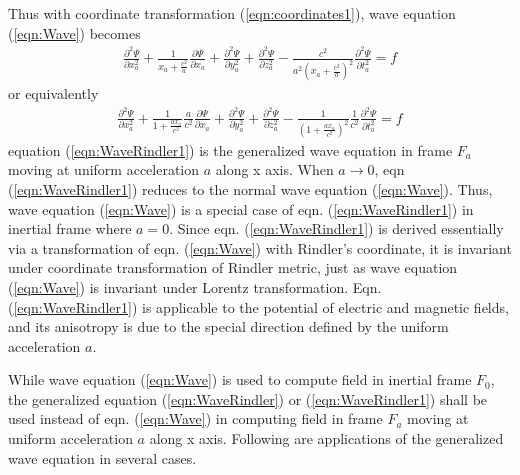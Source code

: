 \documentclass[prd,showpacs,preprint]{revtex4-1}
\begin{document}
Thus with coordinate transformation (\ref{eqn:coordinates1}), wave equation (\ref{eqn:Wave}) becomes
\begin{eqnarray}
\frac{\partial^2 \Psi}{\partial x_a^2} + \frac{1}{x_a+\frac{c^2}{a}}\frac{\partial \Psi}{\partial x_a} + \frac{\partial^2 \Psi}{\partial y_a^2} + \frac{\partial^2 \Psi}{\partial z_a^2} - \frac{c^2}{a^2(x_a+\frac{c^2}{a})^2}\frac{\partial^2 \Psi}{\partial t_a^2}=f
\label{eqn:WaveRindler}
\end{eqnarray}
or equivalently
\begin{eqnarray}
\frac{\partial^2 \Psi}{\partial x_a^2} + \frac{1}{1+\frac{ax_a}{c^2}}\frac{a}{c^2}\frac{\partial \Psi}{\partial x_a} + \frac{\partial^2 \Psi}{\partial y_a^2} + \frac{\partial^2 \Psi}{\partial z_a^2} - \frac{1}{(1+\frac{ax_a}{c^2})^2}\frac{1}{c^2}\frac{\partial^2 \Psi}{\partial t_a^2}=f
\label{eqn:WaveRindler1}
\end{eqnarray}
equation (\ref{eqn:WaveRindler1}) is the generalized wave equation in frame $F_a$ moving at uniform acceleration $a$ along x axis. When $a\to 0$, eqn (\ref{eqn:WaveRindler1}) reduces to the normal wave equation (\ref{eqn:Wave}). Thus, wave equation (\ref{eqn:Wave}) is a special case of eqn. (\ref{eqn:WaveRindler1}) in inertial frame where $a=0$. Since eqn. (\ref{eqn:WaveRindler1}) is derived essentially via a transformation of eqn. (\ref{eqn:Wave}) with Rindler's coordinate, it is invariant under coordinate transformation of Rindler metric, just as wave equation (\ref{eqn:Wave}) is invariant under Lorentz transformation. Eqn. (\ref{eqn:WaveRindler1}) is applicable to the potential of electric and magnetic fields, and its anisotropy is due to the special direction defined by the uniform acceleration $a$.

While wave equation (\ref{eqn:Wave}) is used to compute field in inertial frame $F_0$, the generalized equation (\ref{eqn:WaveRindler}) or (\ref{eqn:WaveRindler1}) shall be used instead of eqn. (\ref{eqn:Wave}) in computing field in frame $F_a$ moving at uniform acceleration $a$ along x axis. Following are applications of the generalized wave equation in several cases.
\end{document}
